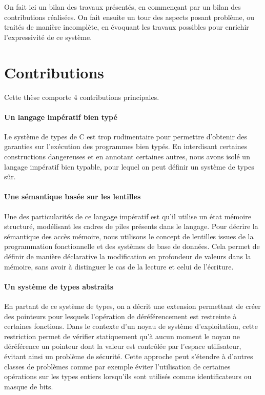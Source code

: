 On fait ici un bilan des travaux présentés, en commençant par un bilan des
contributions réalisées. On fait ensuite un tour des aspects posant problème, ou
traités de manière incomplète, en évoquant les travaux possibles pour enrichir
l'expressivité de ce système.

\section{Contributions}

Cette thèse comporte 4 contributions principales.

\paragraph{Un langage impératif bien typé}

Le système de types de C est trop rudimentaire pour permettre d'obtenir des
garanties sur l'exécution des programmes bien typés. En interdisant certaines
constructions dangereuses et en annotant certaines autres, nous avons isolé un
langage impératif bien typable, pour lequel on peut définir un système de types
sûr.

\paragraph{Une sémantique basée sur les lentilles}

Une des particularités de ce langage impératif est qu'il utilise un état mémoire
structuré, modélisant les cadres de piles présents dans le langage. Pour décrire
la sémantique des accès mémoire, nous utilisons le concept de lentilles issues
de la programmation fonctionnelle et des systèmes de base de données. Cela
permet de définir de manière déclarative la modification en profondeur de
valeurs dans la mémoire, sans avoir à distinguer le cas de la lecture et celui
de l'écriture.

\paragraph{Un système de types abstraits}

En partant de ce système de types, on a décrit une extension permettant de créer
des pointeurs pour lesquels l'opération de déréférencement est restreinte à
certaines fonctions. Dans le contexte d'un noyau de système d'exploitation,
cette restriction permet de vérifier statiquement qu'à aucun moment le noyau ne
déréférence un pointeur dont la valeur est contrôlée par l'espace utilisateur,
évitant ainsi un problème de sécurité. Cette approche peut s'étendre à d'autres
classes de problèmes comme par exemple éviter l'utilisation de certaines
opérations sur les types entiers lorsqu'ils sont utilisés comme identificateurs
ou masque de bits.

